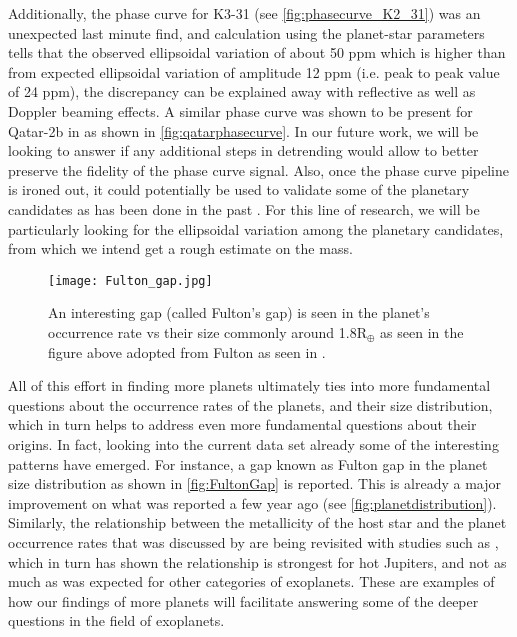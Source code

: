 Additionally, the phase curve for K3-31 (see \autoref{fig:phasecurve_K2_31}) was an unexpected last minute find, and calculation using the planet-star parameters tells that the observed ellipsoidal variation of about 50 ppm which is higher than from expected ellipsoidal variation of amplitude 12 ppm (i.e. peak to peak value of 24 ppm), the discrepancy can be explained away with reflective as well as Doppler beaming effects. A similar phase curve was shown to be present  for Qatar-2b in \citet{dai2017_qatar} as shown in \autoref{fig:qatarphasecurve}. In our future work, we will be looking to answer if any  additional steps in detrending would allow to better preserve the fidelity of the phase curve signal. Also, once the phase curve pipeline is ironed out, it could potentially be used to validate some of the planetary candidates as has been done in the past \citep{mislis2012}. For this line of research, we will be particularly looking for the ellipsoidal variation among the planetary candidates, from which we intend get a rough estimate on the mass.

\begin{figure}[h!]
\centering
\texttt{[image: Fulton\_gap.jpg]}
\caption{\label{fig:FultonGap} An interesting gap (called Fulton's gap) is seen in the planet's occurrence rate vs their size commonly around 1.8R$_\oplus$ as seen in the figure above adopted from Fulton as seen in \citet{fulton2017}.}
\end{figure}

All of this effort in finding more planets ultimately ties into more fundamental questions about the occurrence rates of the planets, and their size distribution, which in turn helps to address even more fundamental questions about their origins. In fact, looking into the current data set already some of the interesting patterns have emerged. For instance, a gap known as Fulton gap in the planet size distribution as shown in \autoref{fig:FultonGap} is reported. This is already a major improvement on what was reported a few year ago (see \autoref{fig:planetdistribution}). Similarly, the relationship between the metallicity of the host star and the planet occurrence rates that was discussed by \citet{fischer2005} are being revisited with studies such as \citet{petigura2017}, which in turn has shown the relationship is strongest for hot Jupiters, and not as much as was expected for other categories of exoplanets. These are examples of how our findings of more planets will facilitate answering some of the deeper questions in the field of exoplanets.

